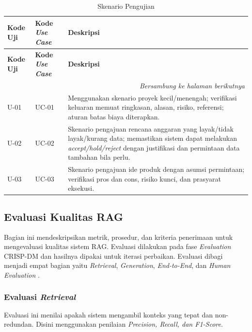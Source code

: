 \begin{longtable}{|p{3cm}|p{3cm}|p{5cm}|}
\caption{Skenario Pengujian}
\label{tbl:Pengujian} \\
\hline
\textbf{Kode Uji} &  \textbf{Kode \textit{Use Case}} &  \textbf{Deskripsi}\\
\hline
\endfirsthead

\hline
\textbf{Kode Uji} &  \textbf{Kode \textit{Use Case}} &  \textbf{Deskripsi}\\
\hline
\endhead

\hline
\multicolumn{3}{r}{\textit{Bersambung ke halaman berikutnya}} \\
\endfoot

\hline
\endlastfoot

U-01
&
UC-01
&
Menggunakan skenario proyek kecil/menengah; verifikasi keluaran memuat ringkasan, alasan, risiko, referensi; aturan batas biaya diterapkan.
\\ \hline

U-02
&
UC-02
&
Skenario pengajuan rencana anggaran yang layak/tidak layak/kurang data; memastikan sistem dapat melakukan \textit{accept/hold/reject} dengan justifikasi dan permintaan data tambahan bila perlu.
\\ \hline

U-03
&
UC-03
&
Skenario pengajuan ide produk dengan asumsi permintaan; verifikasi pros dan cons, risiko kunci, dan prasyarat eksekusi.
\\ \hline
\end{longtable}

\subsection{Evaluasi Kualitas RAG}
Bagian ini mendeskripsikan metrik, prosedur, dan kriteria penerimaan untuk mengevaluasi kualitas sistem RAG. Evaluasi dilakukan pada fase \textit{Evaluation} CRISP-DM dan hasilnya dipakai untuk iterasi perbaikan. Evaluasi dibagi menjadi empat bagian yaitu \textit{Retrieval}, \textit{Generation}, \textit{End-to-End}, dan \textit{Human Evaluation} \autocite{adilnaib2025}.

\subsubsection{Evaluasi \textit{Retrieval}}
Evaluasi ini menilai apakah sistem mengambil konteks yang tepat dan non-redundan. Disini menggunakan penilaian \textit{Precision, Recall, dan F1-Score}.

